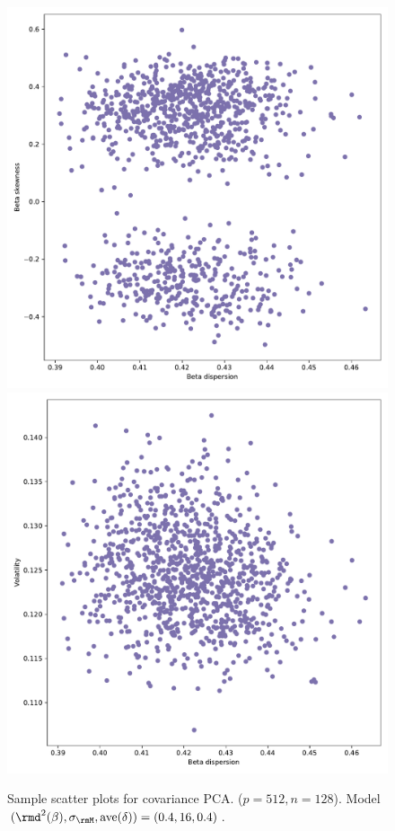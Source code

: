 \documentclass[leqno,12pt]{article}
\begin{document}
{\begin{figure}[htp]
\begin{center}
  \includegraphics[scale=0.33]{img/SampleCovDispersionvsSkew1factorsN128T256disp04fvol16minsvol10maxsvol50}
  \includegraphics[scale=0.33]{img/SampleCovDispersionvsVolatility1factorsN128T256disp04fvol16minsvol10maxsvol50}
\end{center}
\caption{Sample scatter plots for covariance PCA.
($p = 512, n = 128$). Model 
$(\rmd^2(\beta), \sigma_\rmM, \text{ave}(\delta))
= (0.4, 16, 0.4)$.} 
\end{figure}





}
\end{document}
